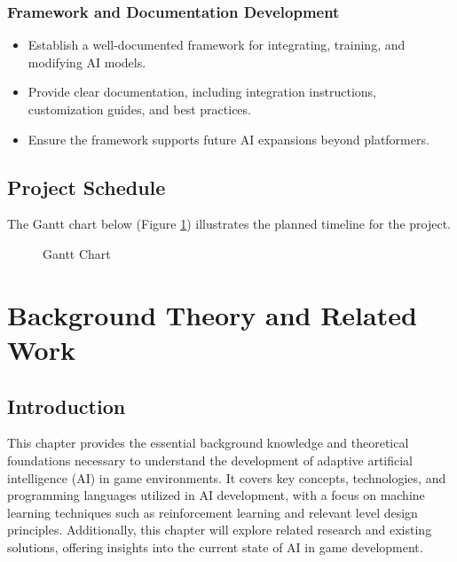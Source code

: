 \documentclass[12pt,oneside,openright,a4paper]{cpe-english-project}
\begin{document}
\subsection{Framework and Documentation Development}
\begin{itemize}
\item Establish a well-documented framework for integrating, training, and modifying AI models.
\item Provide clear documentation, including integration instructions, customization guides, and best practices.
\item Ensure the framework supports future AI expansions beyond platformers.
\end{itemize}
\section{Project Schedule}
The Gantt chart below (Figure \ref{fig:Gantt Chart}) illustrates the planned timeline for the project.
\begin{figure}[!h]
\centering
{}
\caption{Gantt Chart}\label{fig:Gantt Chart}
\end{figure}
\chapter{Background Theory and Related Work}
\section{Introduction}
This chapter provides the essential background knowledge and theoretical foundations necessary to understand the development of adaptive artificial intelligence (AI) in game environments. It covers key concepts, technologies, and programming languages utilized in AI development, with a focus on machine learning techniques such as reinforcement learning and relevant level design principles. Additionally, this chapter will explore related research and existing solutions, offering insights into the current state of AI in game development.
\end{document}
